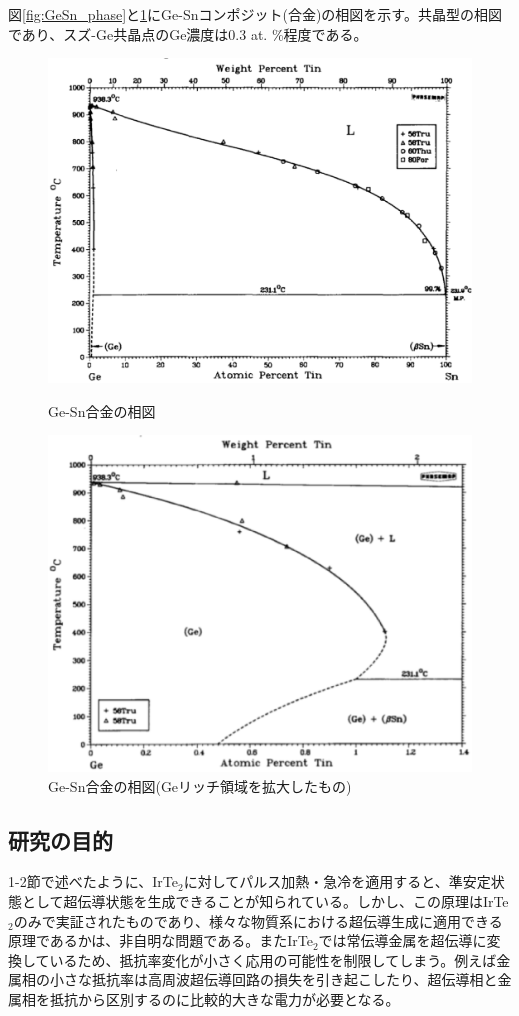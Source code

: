 図\ref{fig:GeSn_phase}と\ref{fig:GeSn_phase2}にGe-Snコンポジット(合金)の相図を示す\cite{Olesinski1984}。共晶型の相図であり、スズ-Ge共晶点のGe濃度は0.3 at. \%程度である\cite{Olesinski1984,Thurmond1960}。
\begin{figure}[!h]
 \begin{minipage}{\hsize}
    \begin{center}
   \includegraphics[width=0.7\hsize]{Introduction/GeSn_phase.eps}
  \end{center}
  \caption{Ge-Sn合金の相図\cite{Olesinski1984}}
  \label{fig:GeSn_phase}
 \end{minipage}
 \begin{minipage}{\hsize}
    \begin{center}
   \includegraphics[width=0.7\hsize]{Introduction/GeSn_phase2.eps}
  \end{center}
  \caption{Ge-Sn合金の相図(Geリッチ領域を拡大したもの)\cite{Olesinski1984}}
  \label{fig:GeSn_phase2}
   \end{minipage}
\end{figure}

\clearpage

\subsection{研究の目的}
1-2節で述べたように、IrTe$_2$に対してパルス加熱・急冷を適用すると、準安定状態として超伝導状態を生成できることが知られている。しかし、この原理はIrTe$_2$のみで実証されたものであり、様々な物質系における超伝導生成に適用できる原理であるかは、非自明な問題である。またIrTe$_2$では常伝導金属を超伝導に変換しているため、抵抗率変化が小さく応用の可能性を制限してしまう。例えば金属相の小さな抵抗率は高周波超伝導回路の損失を引き起こしたり、超伝導相と金属相を抵抗から区別するのに比較的大きな電力が必要となる。

